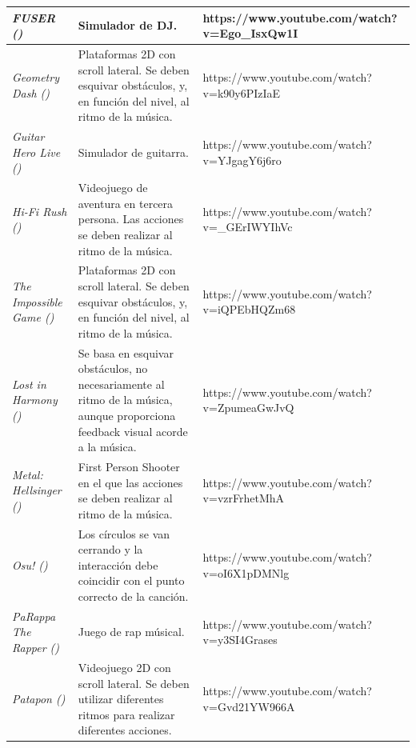 \begin{table}[htbp]
{\begin{tabular}{|l||l||c|}
		\hline
		\textit{FUSER (\cite{FUSER:2020})} & Simulador de DJ. & \multicolumn{1}{l|}{\textcolor[rgb]{ .02,  .388,  .757}{https://www.youtube.com/watch?v=Ego\_IsxQw1I}} \\
		\hline
		\textit{Geometry Dash (\cite{GEOMETRYDASH:2013})} & Plataformas 2D con scroll lateral. Se deben esquivar obstáculos, y, en función del nivel, al ritmo de la música. & \multicolumn{1}{l|}{\textcolor[rgb]{ .02,  .388,  .757}{https://www.youtube.com/watch?v=k90y6PIzIaE}} \\
		\hline
		\textit{Guitar Hero Live (\cite{GUITARHEROLIVE:2015})} & Simulador de guitarra. & \multicolumn{1}{l|}{\textcolor[rgb]{ .02,  .388,  .757}{https://www.youtube.com/watch?v=YJgagY6j6ro}} \\
		\hline
		\textit{Hi-Fi Rush (\cite{HIFIRUSH:2023})} & Videojuego de aventura en tercera persona. Las acciones se deben realizar al ritmo de la música. & \multicolumn{1}{l|}{\textcolor[rgb]{ .02,  .388,  .757}{https://www.youtube.com/watch?v=\_GErIWYIhVc}} \\
		\hline
		\textit{The Impossible Game (\cite{IMPOSSIBLEGAME:2009})} & Plataformas 2D con scroll lateral. Se deben esquivar obstáculos, y, en función del nivel, al ritmo de la música. & \multicolumn{1}{l|}{\textcolor[rgb]{ .02,  .388,  .757}{https://www.youtube.com/watch?v=iQPEbHQZm68}} \\
		\hline
		\textit{Lost in Harmony (\cite{LIH:2016})} & Se basa en esquivar obstáculos, no necesariamente al ritmo de la música, aunque proporciona feedback visual acorde a la música. & \multicolumn{1}{l|}{\textcolor[rgb]{ .02,  .388,  .757}{https://www.youtube.com/watch?v=ZpumeaGwJvQ}} \\
		\hline
		\textit{Metal: Hellsinger (\cite{METALHELLSINGER:2022})} & First Person Shooter en el que las acciones se deben realizar al ritmo de la música. & \multicolumn{1}{l|}{\textcolor[rgb]{ .02,  .388,  .757}{https://www.youtube.com/watch?v=vzrFrhetMhA}} \\
		\hline
		\textit{Osu! (\cite{OSU!:2007})} & Los círculos se van cerrando y la interacción debe coincidir con el punto correcto de la canción. & \multicolumn{1}{l|}{\textcolor[rgb]{ .02,  .388,  .757}{https://www.youtube.com/watch?v=oI6X1pDMNlg}} \\
		\hline
		\textit{PaRappa The Rapper (\cite{PTR:2022})} & Juego de rap músical. & \multicolumn{1}{l|}{\textcolor[rgb]{ .02,  .388,  .757}{https://www.youtube.com/watch?v=y3SI4Grases}} \\
		\hline
		\textit{Patapon (\cite{PATAPON:2007})} & Videojuego 2D con scroll lateral. Se deben utilizar diferentes ritmos para  realizar diferentes acciones. & \multicolumn{1}{l|}{\textcolor[rgb]{ .02,  .388,  .757}{https://www.youtube.com/watch?v=Gvd21YW966A}} \\

\end{tabular}}
\end{table}
